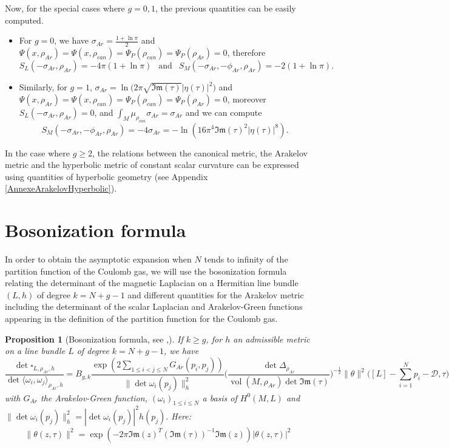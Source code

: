 \documentclass{article}
\newtheorem{Proposition}[theorem]{Proposition}
\theoremstyle{definition}
\theoremstyle{remark}
\DeclareMathOperator{\vol}{vol}
\begin{document}
Now, for the special cases where $g=0,1$, the previous quantities can be easily computed.
\begin{itemize}
    \item For $g=0$, we have $\sigma_{Ar}=\frac{1+\ln\pi}{2}$ and $\Psi(x,\rho_{Ar})=\Psi(x,\rho_{can})=\Psi_{P}(\rho_{can})=\Psi_{P}(\rho_{Ar})=0$, therefore $$S_{L}(-\sigma_{Ar},\rho_{Ar})=-4\pi(1+\ln\pi) ~~ \text{ and }~~ S_{M}(-\sigma_{Ar},-\phi_{Ar},\rho_{Ar})=-2(1+\ln \pi).$$
\item Similarly, for $g=1$, $\sigma_{Ar}=\ln \big(2\pi \sqrt{\mathfrak{Im}(\tau)} |\eta(\tau)|^{2}\big)$ and $\Psi(x,\rho_{Ar})=\Psi(x,\rho_{can})=\Psi_{P}(\rho_{can})=\Psi_{P}(\rho_{Ar})=0$, moreover $S_{L}(-\sigma_{Ar},\rho_{Ar})=0$, and $\int_{M} \mu_{\rho_{can}}\sigma_{Ar}=\sigma_{Ar}$ and we can compute $$S_{M}(-\sigma_{Ar},-\phi_{Ar},\rho_{Ar})=-4\sigma_{Ar}=-\ln\left(16\pi^{4}\mathfrak{Im}(\tau)^{2}|\eta(\tau)|^{8} \right).$$
\end{itemize}

In the case where $g\geq2$, the relations between the canonical metric, the Arakelov metric and the hyperbolic metric of constant scalar curvature can be expressed using quantities of hyperbolic geometry (see Appendix \ref{AnnexeArakelovHyperbolic}). 


\section{Bosonization formula}\label{SectionBoso}
In order to obtain the asymptotic expansion when $N$ tends to infinity of the partition function of the Coulomb gas, we will use the bosonization formula relating the determinant of the magnetic Laplacian on a Hermitian line bundle $(L,h)$ of degree $k=N+g-1$ and different quantities for the Arakelov metric including the determinant of the scalar Laplacian and Arakelov-Green functions appearing in the definition of the partition function for the Coulomb gas.
\begin{Proposition}[Bosonization formula, see {\cite[eq (1.1)]{WentworthGluing}},{\cite[Th. 5.11]{Fay1992KernelFA}}]\label{Pr:FormuleBoso}
    If $k \geq g$, for $h$ an admissible metric on a line bundle $L$ of degree $k=N+g-1$, we have $$\frac{\det \square_{L,\rho_{Ar},h}}{\det \langle \omega_{i}, \omega_{j} \rangle_{\rho_{Ar},h}}= B_{g,k} \frac{\exp\left(2\sum_{1\leq i <j \leq N} G_{Ar}(p_{i},p_{j}) \right)}{\| \det \omega_{i}(p_{j})\|_{h}^{2}}\bigg(\frac{\det\Delta_{\rho_{Ar}}}{\vol(M,\rho_{Ar}) \det \mathfrak{Im}(\tau)}\bigg)^{-\frac{1}{2}}\|\theta\|^{2}\big([L]-\sum_{i=1}^{N}p_{i}-\mathcal{D},\tau\big)$$  with $G_{Ar}$ the Arakelov-Green function, $(\omega_{i})_{1\leq i\leq N}$ a basis of $H^{0}(M,L)$ and $\|\det\omega_{i}(p_{j})\|_{h}^{2}=|\det\omega_{i}(p_{j})|^{2}h(p_{j}).$
Here: $$\|\theta(z,\tau)\|^{2}=\exp\left(-2\pi \mathfrak{Im}(z)^{T}(\mathfrak{Im}(\tau))^{-1}\mathfrak{Im}(z) \right)|\theta(z,\tau)|^{2}$$
\end{Proposition}
\end{document}
